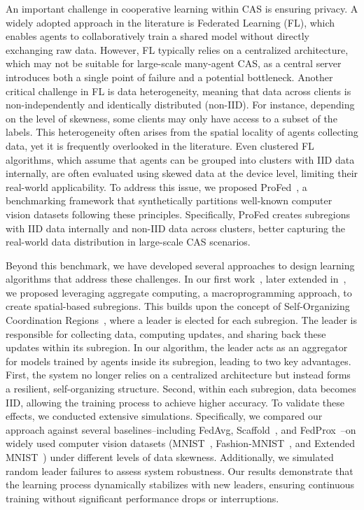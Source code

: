 \documentclass[12pt]{article}
\begin{document}
An important challenge in cooperative learning within CAS is ensuring privacy.
%
A widely adopted approach in the literature is Federated Learning (FL), which enables agents 
 to collaboratively train a shared model without directly exchanging raw data. 
% 
However, FL typically relies on a centralized architecture, which may not be suitable for large-scale many-agent CAS, 
 as a central server introduces both a single point of failure and a potential bottleneck.
%
Another critical challenge in FL is data heterogeneity, meaning that data across clients is 
 non-independently and identically distributed (non-IID).
% 
For instance, depending on the level of skewness, some clients may only have access to a subset of the labels. 
%
This heterogeneity often arises from the spatial locality of agents collecting data, yet it is frequently 
 overlooked in the literature. 
% 
Even clustered FL algorithms, which assume that agents can be grouped into clusters with IID data internally, 
 are often evaluated using skewed data at the device level, limiting their real-world applicability.
%
To address this issue, we proposed ProFed~\cite{DBLP:conf/ijcnn/DominiAV2025}, a benchmarking framework that synthetically 
 partitions well-known computer vision datasets following these principles. 
% 
Specifically, ProFed creates subregions with IID data internally and non-IID data across clusters, better capturing the 
 real-world data distribution in large-scale CAS scenarios.

Beyond this benchmark, we have developed several approaches to design learning algorithms that address these challenges. 
%
In our first work~\cite{DBLP:conf/coordination/DominiAEV24}, later extended in~\cite{domini2025fbflfieldbasedcoordinationapproach}, 
 we proposed leveraging aggregate computing, a macroprogramming approach, to create spatial-based subregions. 
% 
This builds upon the concept of Self-Organizing Coordination Regions~\cite{DBLP:conf/coordination/CasadeiPVN19}, 
 where a leader is elected for each subregion.
%
The leader is responsible for collecting data, computing updates, and sharing back these updates within its subregion.
%
In our algorithm, the leader acts as an aggregator for models trained by agents inside its subregion, leading to two key advantages. 
%
First, the system no longer relies on a centralized architecture but instead forms a resilient, self-organizing structure. 
%
Second, within each subregion, data becomes IID, allowing the training process to achieve higher accuracy.
%
To validate these effects, we conducted extensive simulations. 
%
Specifically, we compared our approach against several baselines--including FedAvg, 
 Scaffold~\cite{DBLP:conf/icml/KarimireddyKMRS20}, and FedProx~\cite{DBLP:conf/mlsys/LiSZSTS20}--on 
 widely used computer vision datasets (MNIST~\cite{lecun2010mnist}, Fashion-MNIST~\cite{DBLP:journals/corr/abs-1708-07747}, 
 and Extended MNIST~\cite{DBLP:journals/corr/CohenATS17}) under different levels of data skewness. 
% 
Additionally, we simulated random leader failures to assess system robustness. 
%
Our results demonstrate that the learning process dynamically stabilizes with new leaders, ensuring continuous training without 
 significant performance drops or interruptions.
\end{document}
